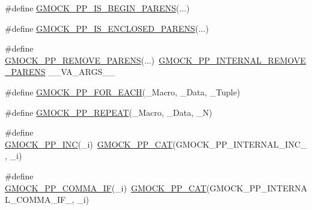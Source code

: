 \begin{DoxyCompactItemize}
\item 
\#define \mbox{\hyperlink{googletest-master_2googlemock_2include_2gmock_2internal_2gmock-pp_8h_a7b8ff4a4176413e60e3f46d14760182a}{G\+M\+O\+C\+K\+\_\+\+P\+P\+\_\+\+I\+S\+\_\+\+B\+E\+G\+I\+N\+\_\+\+P\+A\+R\+E\+NS}}(...)
\item 
\#define \mbox{\hyperlink{googletest-master_2googlemock_2include_2gmock_2internal_2gmock-pp_8h_a10bbc38452431607a40619475c5248aa}{G\+M\+O\+C\+K\+\_\+\+P\+P\+\_\+\+I\+S\+\_\+\+E\+N\+C\+L\+O\+S\+E\+D\+\_\+\+P\+A\+R\+E\+NS}}(...)
\item 
\#define \mbox{\hyperlink{googletest-master_2googlemock_2include_2gmock_2internal_2gmock-pp_8h_a56df0c468739cd6319be90b805a6d5b0}{G\+M\+O\+C\+K\+\_\+\+P\+P\+\_\+\+R\+E\+M\+O\+V\+E\+\_\+\+P\+A\+R\+E\+NS}}(...)~\mbox{\hyperlink{_obj__test_2lib_2googletest-master_2googlemock_2include_2gmock_2internal_2gmock-pp_8h_ac3c1fba05dad44080330c0ecd1208ca6}{G\+M\+O\+C\+K\+\_\+\+P\+P\+\_\+\+I\+N\+T\+E\+R\+N\+A\+L\+\_\+\+R\+E\+M\+O\+V\+E\+\_\+\+P\+A\+R\+E\+NS}} \+\_\+\+\_\+\+V\+A\+\_\+\+A\+R\+G\+S\+\_\+\+\_\+
\item 
\#define \mbox{\hyperlink{googletest-master_2googlemock_2include_2gmock_2internal_2gmock-pp_8h_abc9368d9b0960531e3cfb9e5d6a41816}{G\+M\+O\+C\+K\+\_\+\+P\+P\+\_\+\+F\+O\+R\+\_\+\+E\+A\+CH}}(\+\_\+\+Macro,  \+\_\+\+Data,  \+\_\+\+Tuple)
\item 
\#define \mbox{\hyperlink{googletest-master_2googlemock_2include_2gmock_2internal_2gmock-pp_8h_ab2a0d358d2eb3f04395d0494ab7aab01}{G\+M\+O\+C\+K\+\_\+\+P\+P\+\_\+\+R\+E\+P\+E\+AT}}(\+\_\+\+Macro,  \+\_\+\+Data,  \+\_\+N)
\item 
\#define \mbox{\hyperlink{googletest-master_2googlemock_2include_2gmock_2internal_2gmock-pp_8h_abcffb7b948f0eed30aa35ba3c1e77299}{G\+M\+O\+C\+K\+\_\+\+P\+P\+\_\+\+I\+NC}}(\+\_\+i)~\mbox{\hyperlink{_obj__test_2lib_2googletest-master_2googlemock_2include_2gmock_2internal_2gmock-pp_8h_a108c52ffa81ab99348d23b8fa76fded3}{G\+M\+O\+C\+K\+\_\+\+P\+P\+\_\+\+C\+AT}}(G\+M\+O\+C\+K\+\_\+\+P\+P\+\_\+\+I\+N\+T\+E\+R\+N\+A\+L\+\_\+\+I\+N\+C\+\_\+, \+\_\+i)
\item 
\#define \mbox{\hyperlink{googletest-master_2googlemock_2include_2gmock_2internal_2gmock-pp_8h_acad3f789b483c40204f25a56c3342103}{G\+M\+O\+C\+K\+\_\+\+P\+P\+\_\+\+C\+O\+M\+M\+A\+\_\+\+IF}}(\+\_\+i)~\mbox{\hyperlink{_obj__test_2lib_2googletest-master_2googlemock_2include_2gmock_2internal_2gmock-pp_8h_a108c52ffa81ab99348d23b8fa76fded3}{G\+M\+O\+C\+K\+\_\+\+P\+P\+\_\+\+C\+AT}}(G\+M\+O\+C\+K\+\_\+\+P\+P\+\_\+\+I\+N\+T\+E\+R\+N\+A\+L\+\_\+\+C\+O\+M\+M\+A\+\_\+\+I\+F\+\_\+, \+\_\+i)

\end{DoxyCompactItemize}
